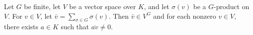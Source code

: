 Let $G$ be finite, let $V$ be a vector space over $K$, and let $\sigma(v)$ be a $G$-product on $V$. For $v \in V$, let $\bar{v} = \sum_{\sigma \in G} \sigma(v)$. Then $\bar{v} \in V^G$ and for each nonzero $v \in V$, there exists $a \in K$ such that $\overline{av} \neq 0$.
